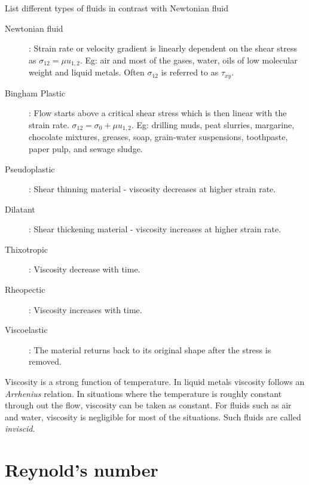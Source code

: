 \begin{lo2}
  List different types of fluids in contrast with Newtonian fluid
\end{lo2}

\begin{description}

\item[Newtonian fluid]: Strain rate or velocity gradient is linearly dependent on the shear stress as $\sigma_{12}=\mu u_{1,2}$. Eg: air and most of the gases, water, oils of low molecular weight and liquid metals. Often $\sigma_{12}$ is referred to as $\tau_{xy}$.

\item[Bingham Plastic]: Flow starts above a critical shear stress which is then linear with the strain rate. $\sigma_{12}= \sigma_{0} + \mu u_{1,2}$. Eg: drilling muds, peat slurries, margarine, chocolate mixtures, greases, soap, grain-water suspensions, toothpaste, paper pulp, and sewage sludge.

\item[Pseudoplastic]: Shear thinning material - viscosity decreases at higher strain rate. 

\item[Dilatant]: Shear thickening material - viscosity increases at higher strain rate.

\item[Thixotropic]: Viscosity decrease with time.

\item[Rheopectic]: Viscosity increases with time.

\item[Viscoelastic]: The material returns back to its original shape after the stress is removed.

\end{description}


Viscosity is a strong function of temperature. In liquid metals viscosity follows an {\em Arrhenius} relation. 
In situations where the temperature is roughly constant through out the flow, viscosity can be taken as constant. 
For fluids such as air and water, viscosity is negligible for most of the situations. Such fluids are called {\em inviscid}.  


\section{Reynold's number}

